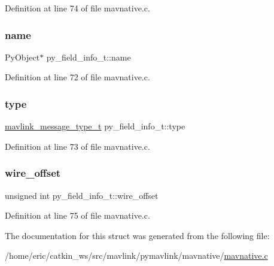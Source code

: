 Definition at line 74 of file mavnative.\+c.

\mbox{\label{structpy__field__info__t_a2608498cd76834f44e809bdbab8a15ae}} 
\subsubsection{\texorpdfstring{name}{name}}
{\footnotesize\ttfamily Py\+Object$\ast$ py\+\_\+field\+\_\+info\+\_\+t\+::name}



Definition at line 72 of file mavnative.\+c.

\mbox{\label{structpy__field__info__t_a2b210dc8b7cf956da25e5ca9566ab592}} 
\subsubsection{\texorpdfstring{type}{type}}
{\footnotesize\ttfamily \mbox{\hyperlink{include__v0_89_2mavlink__types_8h_ab6045b7adc25bdc05a5011a91dc645a4}{mavlink\+\_\+message\+\_\+type\+\_\+t}} py\+\_\+field\+\_\+info\+\_\+t\+::type}



Definition at line 73 of file mavnative.\+c.

\mbox{\label{structpy__field__info__t_a93feb91fe24f3c37a6154f1af3c58f56}} 
\subsubsection{\texorpdfstring{wire\_offset}{wire\_offset}}
{\footnotesize\ttfamily unsigned int py\+\_\+field\+\_\+info\+\_\+t\+::wire\+\_\+offset}



Definition at line 75 of file mavnative.\+c.



The documentation for this struct was generated from the following file\+:\begin{DoxyCompactItemize}
\item 
/home/eric/catkin\+\_\+ws/src/mavlink/pymavlink/mavnative/\mbox{\hyperlink{mavnative_8c}{mavnative.\+c}}\end{DoxyCompactItemize}
